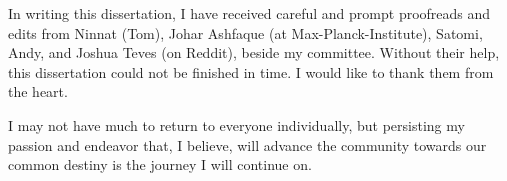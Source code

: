 \begin{acknowledgments}
In writing this dissertation, I have received careful and prompt proofreads and edits from Ninnat (Tom), Johar Ashfaque (at Max-Planck-Institute), Satomi, Andy, and Joshua Teves (on Reddit), beside my committee.
Without their help, this dissertation could not be finished in time. I would like to thank them from the heart.

I may not have much to return to everyone individually, but persisting my passion and endeavor that, I believe, will advance the community towards our common destiny is the journey I will continue on.
\end{acknowledgments} 
